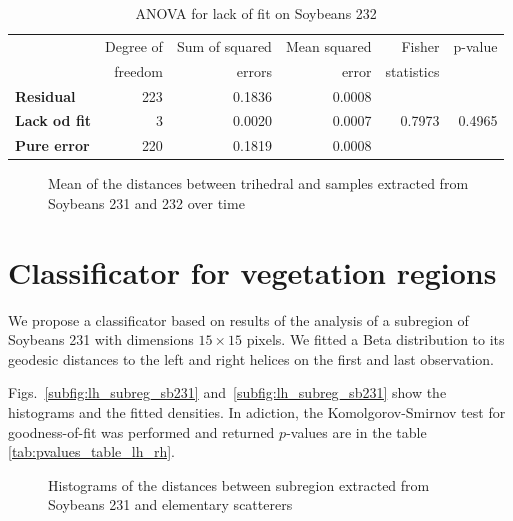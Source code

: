 \documentclass[12pt]{article}
\begin{document}
\begin{table}[hbt]
  \centering
  \caption{ANOVA for lack of fit on Soybeans 232}
  \label{tab:anova_sb232}
  \begin{tabular}{lrrrrr}
    \toprule
    & Degree of & Sum of squared & Mean squared & Fisher & p-value\\
    & freedom & errors & error & statistics &\\
    \cmidrule(lr){2-6}
    \textbf{Residual} & 223 & 0.1836 & 0.0008 & &\\
    \textbf{Lack od fit} & 3 & 0.0020 & 0.0007 & 0.7973 & 0.4965\\
    \textbf{Pure error} & 220 & 0.1819 & 0.0008 & &\\
    \bottomrule
  \end{tabular}
\end{table}

\begin{figure}[hbt]
  \caption{Mean of the distances between trihedral and samples extracted from Soybeans 231 and 232 over time}
  \label{fig:tri_mean_sb_231_232}
\end{figure}

\section{Classificator for vegetation regions}

We propose a classificator based on results of the analysis of a subregion of Soybeans 231 with dimensions $15\times 15$ pixels. 
We fitted a Beta distribution to its geodesic distances to the left and right helices on the first and last observation. 

Figs.~\ref{subfig:lh_subreg_sb231} and~\ref{subfig:lh_subreg_sb231} show the histograms and the fitted densities. 
In adiction, the Komolgorov-Smirnov test for goodness-of-fit was performed and returned $p$-values are in the table \ref{tab:pvalues_table_lh_rh}.

\begin{figure}[hbt]
  \caption{Histograms of the distances between subregion extracted from Soybeans 231 and elementary scatterers}
  \label{fig:hist_lh_rh}
\end{figure}
\end{document}
